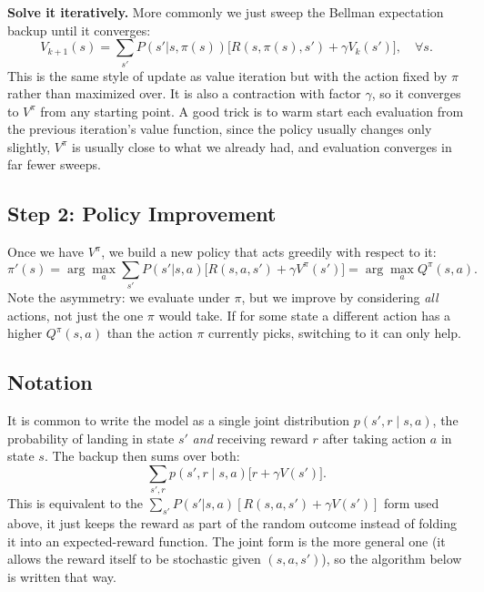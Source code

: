 \documentclass[conference]{IEEEtran}
\begin{document}
\textbf{Solve it iteratively.} More commonly we just sweep the Bellman expectation backup until it converges:
\[
    V_{k+1}(s) = \sum_{s'} P(s'|s,\pi(s))\big[R(s,\pi(s),s') + \gamma V_k(s')\big], \quad \forall s.
\]
This is the same style of update as value iteration but with the action fixed by $\pi$ rather than maximized over. It is also a contraction with factor $\gamma$, so it converges to $V^\pi$ from any starting point. A good trick is to warm start each evaluation from the previous iteration's value function, since the policy usually changes only slightly, $V^\pi$ is usually close to what we already had, and evaluation converges in far fewer sweeps.

\subsection*{Step 2: Policy Improvement}
Once we have $V^\pi$, we build a new policy that acts greedily with respect to it:
\[
    \pi'(s) = \arg\max_{a} \sum_{s'} P(s'|s,a)\big[R(s,a,s') + \gamma V^\pi(s')\big] = \arg\max_a Q^\pi(s,a).
\]
Note the asymmetry: we evaluate under $\pi$, but we improve by considering \emph{all} actions, not just the one $\pi$ would take. If for some state a different action has a higher $Q^\pi(s,a)$ than the action $\pi$ currently picks, switching to it can only help.

\subsection*{Notation}
It is common to write the model as a single joint distribution $p(s', r \mid s, a)$, the probability of landing in state $s'$ \emph{and} receiving reward $r$ after taking action $a$ in state $s$. The backup then sums over both:
\[
    \sum_{s', r} p(s', r \mid s, a)\big[r + \gamma V(s')\big].
\]
This is equivalent to the $\sum_{s'} P(s'|s,a)[R(s,a,s') + \gamma V(s')]$ form used above, it just keeps the reward as part of the random outcome instead of folding it into an expected-reward function. The joint form is the more general one (it allows the reward itself to be stochastic given $(s,a,s')$), so the algorithm below is written that way.
\end{document}
